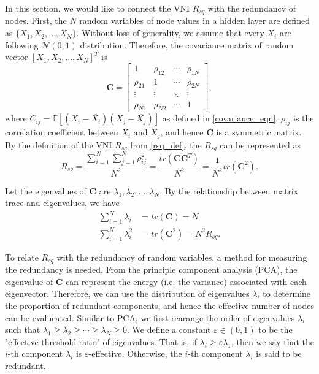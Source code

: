 In this section, we would like to connect the VNI $R_{sq}$ with the redundancy of nodes.
First, the $N$ random variables of node values in a hidden layer are defined as $\{X_1, X_2, ..., X_N\}$.
Without loss of generality, we assume that every $X_i$ are following $\mathcal{N}(0, 1)$ distribution.
Therefore, the covariance matrix of random vector $[X_1, X_2, ..., X_N]^T$ is
\begin{equation}
    \mathbf{C}=
    \begin{bmatrix}
        1 & \rho_{12} & \cdots & \rho_{1N} \\
        \rho_{21} & 1 & \cdots & \rho_{2N} \\
        \vdots & \vdots & \ddots & \vdots  \\
        \rho_{N1} & \rho_{N2} & \cdots & 1
    \end{bmatrix},
    \label{rv_cov}
\end{equation}
where $C_{ij}=\mathbb{E}[(X_i-\overline{X_i})(X_j-\overline{X_j})]$ as defined in
\eqref{covariance_eqn}, $\rho_{ij}$ is the correlation coefficient between $X_i$ and $X_j$,
and hence $\mathbf{C}$ is a symmetric matrix.
By the definition of the VNI $R_{sq}$ from \eqref{rsq_def}, the $R_{sq}$
can be represented as
\begin{equation}
    R_{sq}=\frac{\sum_{i=1}^N\sum_{j=1}^N\rho_{ij}^2}{N^2}
    =\frac{tr(\mathbf{C}\mathbf{C}^T)}{N^2}=\frac{1}{N^2}tr(\mathbf{C}^2).
    \label{rv_rsq}
\end{equation}

Let the eigenvalues of $\mathbf{C}$ are $\lambda_1, \lambda_2, \dots, \lambda_N$.
By the relationship between matrix trace and eigenvalues, we have
\begin{equation}
    \begin{aligned}
        \sum_{i=1}^N\lambda_i&=tr(\mathbf{C})=N\\
    \sum_{i=1}^N\lambda_i^2&=tr(\mathbf{C}^2)=N^2R_{sq}.
    \end{aligned}
    \label{rv_eigen}
\end{equation}

To relate $R_{sq}$ with the redundancy of random variables, a method for measuring the redundancy
is needed.
From the principle component analysis (PCA), the eigenvalue of $\mathbf{C}$ can represent the 
energy (i.e. the variance) associated with each eigenvector.
Therefore, we can use the distribution of eigenvalues $\lambda_i$ to determine the proportion of
redundant components, and hence the effective number of nodes can be evalueated.
Similar to PCA, we first rearange the order of eigenvalues $\lambda_i$ such that
$\lambda_1\geq\lambda_2\geq\cdots\geq\lambda_N\geq 0$.
We define a constant $\varepsilon\in(0, 1)$ to be the "effective threshold ratio" of eigenvalues.
That is, if $\lambda_i \geq \varepsilon\lambda_1$, then we say that the $i$-th component $\lambda_i$ is
$\varepsilon$-effective.
Otherwise, the $i$-th component $\lambda_i$ is said to be redundant.

